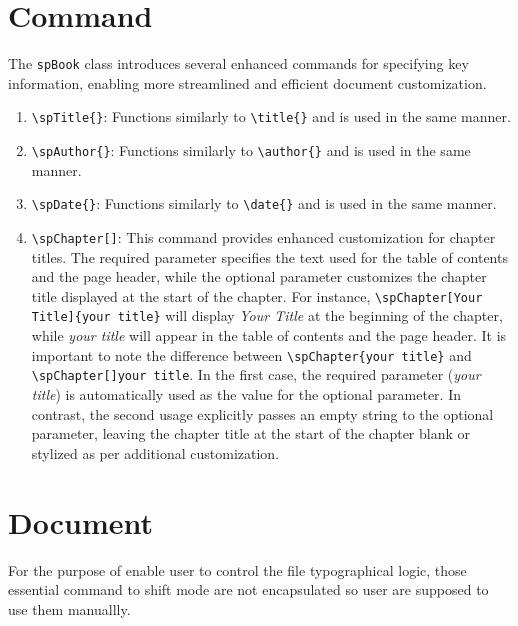 \section{Command}
    The \texttt{spBook} class introduces several enhanced commands for specifying key information, enabling more streamlined and efficient document customization.
    \begin{enumerate}
        \item \texttt{\textbackslash spTitle\{\}}: Functions similarly to \texttt{\textbackslash title\{\}} and is used in the same manner.
        \item \texttt{\textbackslash spAuthor\{\}}: Functions similarly to \texttt{\textbackslash author\{\}} and is used in the same manner.
        \item \texttt{\textbackslash spDate\{\}}: Functions similarly to \texttt{\textbackslash date\{\}} and is used in the same manner.
        \item \texttt{\textbackslash spChapter[]{}}: This command provides enhanced customization for chapter titles. The required parameter specifies the text used for the table of contents and the page header, while the optional parameter customizes the chapter title displayed at the start of the chapter. For instance, \texttt{\textbackslash spChapter[Your Title]\{your title\}} will display \emph{Your Title} at the beginning of the chapter, while \emph{your title} will appear in the table of contents and the page header. It is important to note the difference between \texttt{\textbackslash spChapter\{your title\}} and \texttt{\textbackslash spChapter[]{your title}}. In the first case, the required parameter (\emph{your title}) is automatically used as the value for the optional parameter. In contrast, the second usage explicitly passes an empty string to the optional parameter, leaving the chapter title at the start of the chapter blank or stylized as per additional customization.
    \end{enumerate}

\section{Document}
    For the purpose of enable user to control the file typographical logic, those essential command to shift mode are not encapsulated so user are supposed to use them manuallly.